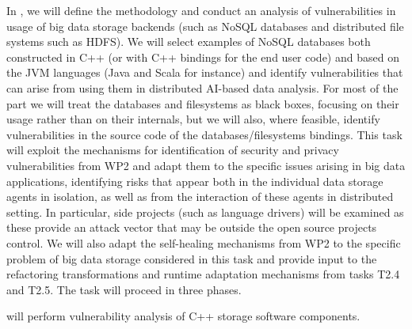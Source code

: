 \begin{Workpackage}{\thewpno}
\begin{Task}
\TaskResults{%
}
\TaskHeader{}
In \theTask, we will define the methodology and conduct an analysis of vulnerabilities in usage of big data storage backends (such as NoSQL databases and distributed file systems such as HDFS).  We will select examples of NoSQL databases both constructed in C++ (or with C++ bindings for the end user code) and based on the JVM languages (Java and Scala for instance) and identify vulnerabilities that can arise from using them in distributed AI-based data analysis. For most of the part we will treat the databases and filesystems as black boxes, focusing on their usage rather than on their internals, but we will also, where feasible, identify vulnerabilities in the source code of the databases/filesystems bindings. This task will exploit the mechanisms for identification of security and privacy vulnerabilities from WP2 and adapt them to the specific issues arising in big data applications, identifying risks that appear both in the individual data storage agents in isolation, as well as from the interaction of these agents in distributed setting. In particular, side projects (such as language drivers) will be examined as these provide an attack vector that may be outside the open source projects control. We will 
also adapt the self-healing mechanisms from WP2 to the specific problem of big data storage considered in this task and provide input to the refactoring transformations and runtime adaptation mechanisms from tasks T2.4 and T2.5. The task will proceed in three phases.
 
\UCM will perform vulnerability analysis of C++ storage software components.
 \end{Task}

 \begin{Task}
 

\end{Task}
\end{Workpackage}
